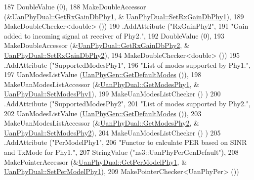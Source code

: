 \begin{DoxyCode}
187                    DoubleValue (0),
188                    MakeDoubleAccessor (&\hyperlink{classns3_1_1UanPhyDual_a8c1ff7b73b3b9f24b800b9c6c12d88e1}{UanPhyDual::GetRxGainDbPhy1}, &
      \hyperlink{classns3_1_1UanPhyDual_a4208c9b2161ec71a76bc0b17084b805b}{UanPhyDual::SetRxGainDbPhy1}),
189                    MakeDoubleChecker<double> ())
190     .AddAttribute (\textcolor{stringliteral}{"RxGainPhy2"},
191                    \textcolor{stringliteral}{"Gain added to incoming signal at receiver of Phy2."},
192                    DoubleValue (0),
193                    MakeDoubleAccessor (&\hyperlink{classns3_1_1UanPhyDual_ab0a8e06dcfba7ec81293547ed1d8c275}{UanPhyDual::GetRxGainDbPhy2}, &
      \hyperlink{classns3_1_1UanPhyDual_a921b74b5ae9ac88b57a514bae23d8685}{UanPhyDual::SetRxGainDbPhy2}),
194                    MakeDoubleChecker<double> ())
195     .AddAttribute (\textcolor{stringliteral}{"SupportedModesPhy1"},
196                    \textcolor{stringliteral}{"List of modes supported by Phy1."},
197                    UanModesListValue (\hyperlink{classns3_1_1UanPhyGen_a6b3ea9cb37436baa774cd2c9e9852376}{UanPhyGen::GetDefaultModes} ()),
198                    MakeUanModesListAccessor (&\hyperlink{classns3_1_1UanPhyDual_ac4636feefd74c30695371d7ac373fd85}{UanPhyDual::GetModesPhy1}, &
      \hyperlink{classns3_1_1UanPhyDual_a86ff19d361148fa1cfd23d80d8e06fb6}{UanPhyDual::SetModesPhy1}),
199                    MakeUanModesListChecker () )
200     .AddAttribute (\textcolor{stringliteral}{"SupportedModesPhy2"},
201                    \textcolor{stringliteral}{"List of modes supported by Phy2."},
202                    UanModesListValue (\hyperlink{classns3_1_1UanPhyGen_a6b3ea9cb37436baa774cd2c9e9852376}{UanPhyGen::GetDefaultModes} ()),
203                    MakeUanModesListAccessor (&\hyperlink{classns3_1_1UanPhyDual_a9447bc831437db5046075ec22b1ec2b6}{UanPhyDual::GetModesPhy2}, &
      \hyperlink{classns3_1_1UanPhyDual_a411f74a7c5da6aa8603a914c25056148}{UanPhyDual::SetModesPhy2}),
204                    MakeUanModesListChecker () )
205     .AddAttribute (\textcolor{stringliteral}{"PerModelPhy1"},
206                    \textcolor{stringliteral}{"Functor to calculate PER based on SINR and TxMode for Phy1."},
207                    StringValue (\textcolor{stringliteral}{"ns3::UanPhyPerGenDefault"}),
208                    MakePointerAccessor (&\hyperlink{classns3_1_1UanPhyDual_abf21e856a7f9fa3f1aff5e5e2964c8d3}{UanPhyDual::GetPerModelPhy1}, &
      \hyperlink{classns3_1_1UanPhyDual_a32127bf586c927b2c7bc8a0f6883596d}{UanPhyDual::SetPerModelPhy1}),
209                    MakePointerChecker<UanPhyPer> ())

\end{DoxyCode}
